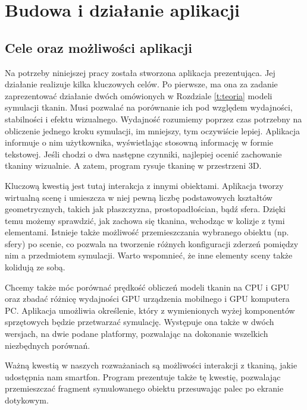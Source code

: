 \chapter{Budowa i działanie aplikacji}
\label{t:praktyka}
	
	\section{Cele oraz możliwości aplikacji}
	\label{t:praktyka:cel}
	
	
	Na potrzeby niniejszej pracy została stworzona aplikacja prezentująca. Jej działanie realizuje kilka kluczowych celów. Po pierwsze, ma ona za zadanie zaprezentować działanie dwóch omówionych w Rozdziale \ref{t:teoria} modeli symulacji tkanin. Musi pozwalać na porównanie ich pod względem wydajności, stabilności i efektu wizualnego. Wydajność rozumiemy poprzez czas potrzebny na obliczenie jednego kroku symulacji, im mniejszy, tym oczywiście lepiej. Aplikacja informuje o nim użytkownika, wyświetlając stosowną informację w formie tekstowej. Jeśli chodzi o dwa następne czynniki, najlepiej ocenić zachowanie tkaniny wizualnie. A zatem, program rysuje tkaninę w przestrzeni 3D. 
	
	Kluczową kwestią jest tutaj interakcja z innymi obiektami. Aplikacja tworzy wirtualną scenę i umieszcza w niej pewną liczbę podstawowych kształtów geometrycznych, takich jak płaszczyzna, prostopadłościan, bądź sfera. Dzięki temu możemy sprawdzić, jak zachowa się tkanina, wchodząc w kolizje z tymi elementami. Istnieje także możliwość przemieszczania wybranego obiektu (np. sfery) po scenie, co pozwala na tworzenie różnych konfiguracji zderzeń pomiędzy nim a przedmiotem symulacji. Warto wspomnieć, że inne elementy sceny także kolidują ze sobą.
	
	Chcemy także móc porównać prędkość obliczeń modeli tkanin na CPU i GPU oraz zbadać różnicę wydajności GPU urządzenia mobilnego i GPU komputera PC. Aplikacja umożliwia określenie, który z wymienionych wyżej komponentów sprzętowych będzie przetwarzać symulację. Występuje ona także w dwóch wersjach, na dwie podane platformy, pozwalając na dokonanie wszelkich niezbędnych porównań.
	
	Ważną kwestią w naszych rozważaniach są możliwości interakcji z tkaniną, jakie udostępnia nam smartfon. Program prezentuje także tę kwestię, pozwalając przemieszczać fragment symulowanego obiektu przesuwając palec po ekranie dotykowym.
	
